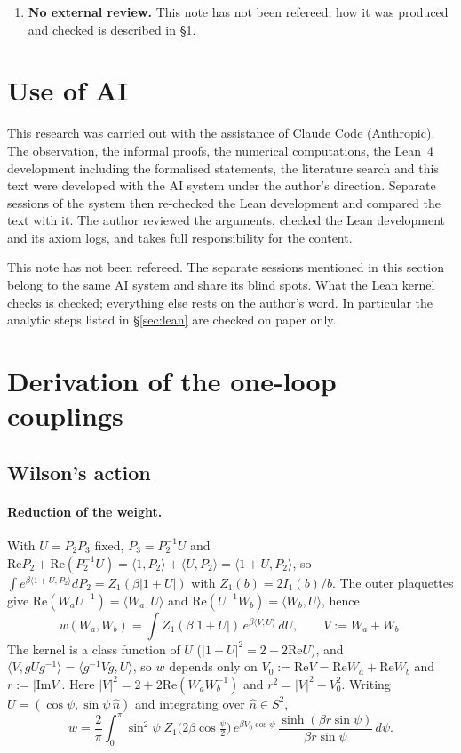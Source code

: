 \documentclass[11pt,a4paper]{article}
\theoremstyle{definition}
\theoremstyle{remark}
\begin{document}
\begin{enumerate}[label=\arabic*.]
\item \textbf{No external review.} This note has not been refereed; how it was produced and checked is described in \S\ref{sec:ai}.
\end{enumerate}

\fussy
\section{Use of AI}\label{sec:ai}

This research was carried out with the assistance of Claude Code (Anthropic). The observation, the informal proofs, the numerical computations, the Lean~4 development including the formalised statements, the literature search and this text were developed with the AI system under the author's direction. Separate sessions of the system then re-checked the Lean development and compared the text with it. The author reviewed the arguments, checked the Lean development and its axiom logs, and takes full responsibility for the content.

This note has not been refereed. The separate sessions mentioned in this section belong to the same AI system and share its blind spots. What the Lean kernel checks is checked; everything else rests on the author's word. In particular the analytic steps listed in \S\ref{sec:lean} are checked on paper only.

\appendix
\section{Derivation of the one-loop couplings}\label{app:oneloop}

\subsection{Wilson's action}\label{app:wilson}
\paragraph{Reduction of the weight.}
With $U=P_2P_3$ fixed, $P_3=P_2^{-1}U$ and $\mathrm{Re}P_2+\mathrm{Re}(P_2^{-1}U)=\langle1,P_2\rangle+\langle U,P_2\rangle=\langle1+U,P_2\rangle$, so $\int e^{\beta\langle1+U,P_2\rangle}dP_2=Z_1(\beta|1+U|)$ with $Z_1(b)=2I_1(b)/b$.
The outer plaquettes give $\mathrm{Re}(W_aU^{-1})=\langle W_a,U\rangle$ and $\mathrm{Re}(U^{-1}W_b)=\langle W_b,U\rangle$, hence
\[
w(W_a,W_b)=\int Z_1(\beta|1+U|)\,e^{\beta\langle V,U\rangle}\,dU,\qquad V:=W_a+W_b .
\]
The kernel is a class function of $U$ ($|1+U|^2=2+2\mathrm{Re}U$), and $\langle V,gUg^{-1}\rangle=\langle g^{-1}Vg,U\rangle$, so $w$ depends only on $V_0:=\mathrm{Re}V=\mathrm{Re}W_a+\mathrm{Re}W_b$ and $r:=|\mathrm{Im}V|$.
Here $|V|^2=2+2\mathrm{Re}(W_aW_b^{-1})$ and $r^2=|V|^2-V_0^2$.
Writing $U=(\cos\psi,\sin\psi\,\hat n)$ and integrating over $\hat n\in S^2$,
\[
w=\frac2\pi\int_0^\pi\sin^2\psi\;Z_1\bigl(2\beta\cos\tfrac\psi2\bigr)\,e^{\beta V_0\cos\psi}\,\frac{\sinh(\beta r\sin\psi)}{\beta r\sin\psi}\,d\psi .
\]
\end{document}
